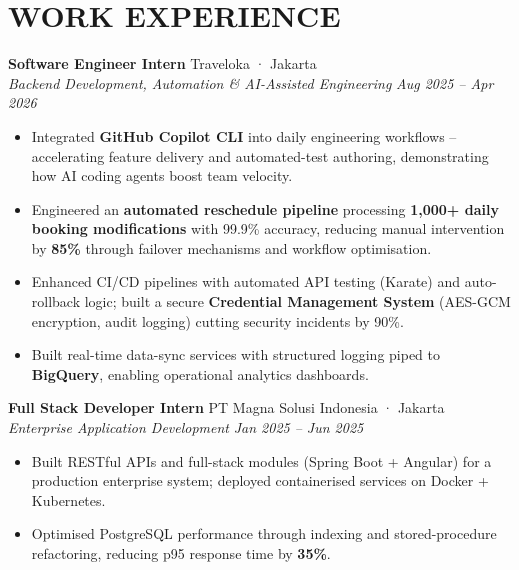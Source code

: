 \documentclass[10pt,a4paper]{article}
\newcommand{\experienceheader}[4]{
    \textbf{#1} \hfill #2 \\
    \textit{#3} \hfill \textit{#4}
}
\begin{document}
\vspace{-4pt}

\section*{WORK EXPERIENCE}

\experienceheader{Software Engineer Intern}{Traveloka · Jakarta}{Backend Development, Automation \& AI-Assisted Engineering}{Aug 2025 -- Apr 2026}
\begin{itemize}[leftmargin=*, itemsep=1pt, topsep=1pt]
    \item Integrated \textbf{GitHub Copilot CLI} into daily engineering workflows -- accelerating feature delivery and automated-test authoring, demonstrating how AI coding agents boost team velocity.
    \item Engineered an \textbf{automated reschedule pipeline} processing \textbf{1,000+ daily booking modifications} with 99.9\% accuracy, reducing manual intervention by \textbf{85\%} through failover mechanisms and workflow optimisation.
    \item Enhanced CI/CD pipelines with automated API testing (Karate) and auto-rollback logic; built a secure \textbf{Credential Management System} (AES-GCM encryption, audit logging) cutting security incidents by 90\%.
    \item Built real-time data-sync services with structured logging piped to \textbf{BigQuery}, enabling operational analytics dashboards.
\end{itemize}

\vspace{2pt}

\experienceheader{Full Stack Developer Intern}{PT Magna Solusi Indonesia · Jakarta}{Enterprise Application Development}{Jan 2025 -- Jun 2025}
\begin{itemize}[leftmargin=*, itemsep=1pt, topsep=1pt]
    \item Built RESTful APIs and full-stack modules (Spring Boot + Angular) for a production enterprise system; deployed containerised services on Docker + Kubernetes.
    \item Optimised PostgreSQL performance through indexing and stored-procedure refactoring, reducing p95 response time by \textbf{35\%}.
\end{itemize}
\end{document}
